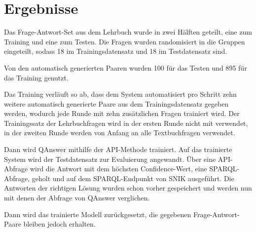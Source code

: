 \documentclass[utf8,biblatex]{lni}
\begin{document}
\section{Ergebnisse}

Das Frage-Antwort-Set aus dem Lehrbuch wurde in zwei Hälften geteilt, eine zum Training und eine zum Testen.
Die Fragen wurden randomisiert in die Gruppen eingeteilt, sodass 18 im Trainingsdatensatz und 18 im Testdatensatz sind.

Von den automatisch generierten Paaren wurden 100 für das Testen und 895 für das Training genutzt.

Das Training verläuft so ab, dass dem System automatisiert pro Schritt zehn weitere automatisch generierte Paare aus dem Trainingsdatensatz gegeben werden,
wodurch jede Runde mit zehn zusätzlichen Fragen trainiert wird.
Der Trainingssatz der Lehrbuchfragen wird in der ersten Runde nicht mit verwendet,
in der zweiten Runde werden von Anfang an alle Textbuchfragen verwendet.

Dann wird QAnswer mithilfe der API-Methode trainiert.
Auf das trainierte System wird der Testdatensatz zur Evaluierung angewandt.
Über eine API-Abfrage wird die Antwort mit dem höchsten Confidence-Wert, eine SPARQL-Abfrage, geholt und auf dem SPARQL-Endpunkt von SNIK ausgeführt.
Die Antworten der richtigen Lösung wurden schon vorher gespeichert und werden nun mit denen der Abfrage von QAnswer verglichen.

Dann wird das trainierte Modell zurückgesetzt, die gegebenen Frage-Antwort-Paare bleiben jedoch erhalten.
\end{document}
